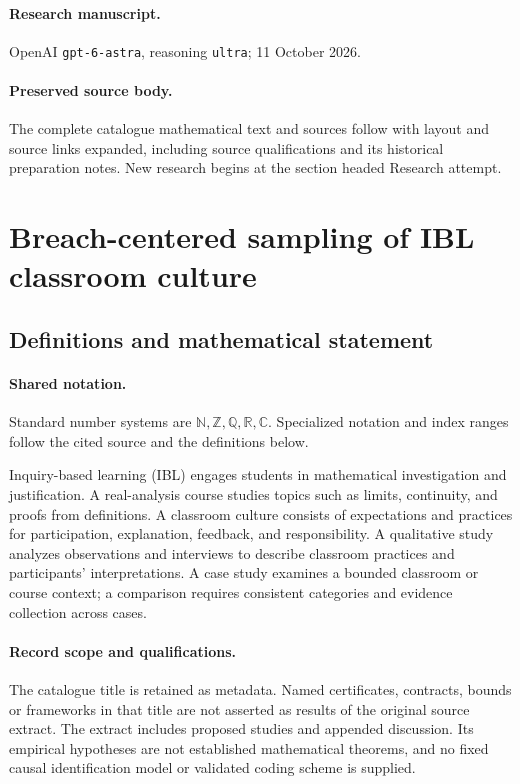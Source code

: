 \documentclass[11pt]{article}
\begin{document}
\paragraph{Research manuscript.} OpenAI \texttt{gpt-6-astra}, reasoning \texttt{ultra}; 11 October 2026.
\paragraph{Preserved source body.} The complete catalogue mathematical text and sources follow with layout and source links expanded, including source qualifications and its historical preparation notes. New research begins at the section headed Research attempt.

\section{Breach-centered sampling of IBL classroom culture}\label{statement}

\subsection{Definitions and mathematical statement}

\paragraph{Shared notation.}Standard number systems are $\mathbb N,\mathbb Z,\mathbb Q,\mathbb R,\mathbb C$. Specialized notation and index ranges follow the cited source and the definitions below.


Inquiry-based learning (IBL) engages students in mathematical investigation and justification. A real-analysis course studies topics such as limits, continuity, and proofs from definitions. A classroom culture consists of expectations and practices for participation, explanation, feedback, and responsibility. A qualitative study analyzes observations and interviews to describe classroom practices and participants' interpretations. A case study examines a bounded classroom or course context; a comparison requires consistent categories and evidence collection across cases.
\paragraph{Record scope and qualifications.}
The catalogue title is retained as metadata. Named certificates, contracts, bounds or frameworks in that title are not asserted as results of the original source extract.
The extract includes proposed studies and appended discussion. Its empirical hypotheses are not established mathematical theorems, and no fixed causal identification model or validated coding scheme is supplied.
\end{document}
